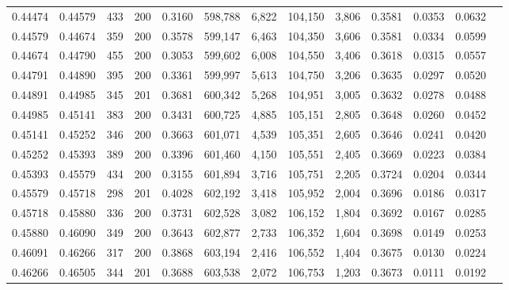 \begin{tabular}{rrrrrrrrrrrrr}
0.44474 & 0.44579 &   433 & 200 &                                     0.3160 & 598,788 &   6,822 & 104,150 &   3,806 & 0.3581 & 0.0353 & 0.0632 \\
0.44579 & 0.44674 &   359 & 200 &                                     0.3578 & 599,147 &   6,463 & 104,350 &   3,606 & 0.3581 & 0.0334 & 0.0599 \\
0.44674 & 0.44790 &   455 & 200 &                                     0.3053 & 599,602 &   6,008 & 104,550 &   3,406 & 0.3618 & 0.0315 & 0.0557 \\
0.44791 & 0.44890 &   395 & 200 &                                     0.3361 & 599,997 &   5,613 & 104,750 &   3,206 & 0.3635 & 0.0297 & 0.0520 \\
0.44891 & 0.44985 &   345 & 201 &                                     0.3681 & 600,342 &   5,268 & 104,951 &   3,005 & 0.3632 & 0.0278 & 0.0488 \\
0.44985 & 0.45141 &   383 & 200 &                                     0.3431 & 600,725 &   4,885 & 105,151 &   2,805 & 0.3648 & 0.0260 & 0.0452 \\
0.45141 & 0.45252 &   346 & 200 &                                     0.3663 & 601,071 &   4,539 & 105,351 &   2,605 & 0.3646 & 0.0241 & 0.0420 \\
0.45252 & 0.45393 &   389 & 200 &                                     0.3396 & 601,460 &   4,150 & 105,551 &   2,405 & 0.3669 & 0.0223 & 0.0384 \\
0.45393 & 0.45579 &   434 & 200 &                                     0.3155 & 601,894 &   3,716 & 105,751 &   2,205 & 0.3724 & 0.0204 & 0.0344 \\
0.45579 & 0.45718 &   298 & 201 &                                     0.4028 & 602,192 &   3,418 & 105,952 &   2,004 & 0.3696 & 0.0186 & 0.0317 \\
0.45718 & 0.45880 &   336 & 200 &                                     0.3731 & 602,528 &   3,082 & 106,152 &   1,804 & 0.3692 & 0.0167 & 0.0285 \\
0.45880 & 0.46090 &   349 & 200 &                                     0.3643 & 602,877 &   2,733 & 106,352 &   1,604 & 0.3698 & 0.0149 & 0.0253 \\
0.46091 & 0.46266 &   317 & 200 &                                     0.3868 & 603,194 &   2,416 & 106,552 &   1,404 & 0.3675 & 0.0130 & 0.0224 \\
0.46266 & 0.46505 &   344 & 201 &                                     0.3688 & 603,538 &   2,072 & 106,753 &   1,203 & 0.3673 & 0.0111 & 0.0192 \\

\end{tabular}

